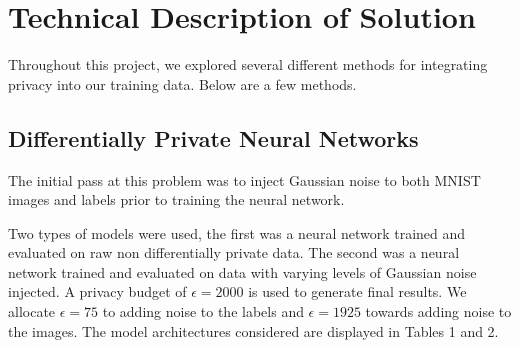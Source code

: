 \documentclass[12pt]{report}
\begin{document}
\section{Technical Description of Solution}
Throughout this project, we explored several different methods for integrating privacy into our training data. Below are a few methods. 

\subsection{Differentially Private Neural Networks}
The initial pass at this problem was to inject Gaussian noise to both MNIST images and labels prior to training the neural network. 

Two types of models were used, the first was a neural network trained and evaluated on raw non differentially private data. The second was a neural network trained and evaluated on data with varying levels of Gaussian noise injected. A privacy budget of $\epsilon = 2000$ is used to generate final results. We allocate $\epsilon = 75$ to adding noise to the labels and $\epsilon = 1925$ towards adding noise to the images. The model architectures considered are displayed in Tables 1 and 2. 
\end{document}
